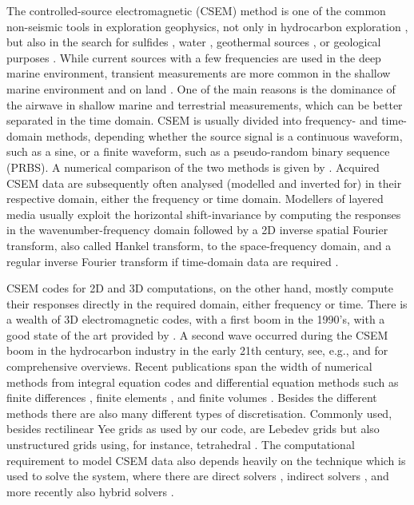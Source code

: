 \documentclass[
    manuscript,
  ]{geophysics}
\begin{document}
The controlled-source electromagnetic (CSEM) method is one of the common
non-seismic tools in exploration geophysics, not only in hydrocarbon
exploration \citep{GEO.10.Constable}, but also in the search for sulfides
\citep{GRL.19.Gehrmann}, water \citep{GEO.05.Pedersen}, geothermal sources
\citep{WGC.15.Girard}, or geological purposes \citep{NAT.19.Johanson}. While
current sources with a few frequencies are used in the deep marine environment,
transient measurements are more common in the shallow marine environment and on
land \citep[e.g., ][]{GEO.07.Ziolkowski, SEG.07.Andreis, SEG.07.Avdeeva}. One
of the main reasons is the dominance of the airwave in shallow marine and
terrestrial measurements, which can be better separated in the time domain.
CSEM is usually divided into frequency- and time-domain methods, depending
whether the source signal is a continuous waveform, such as a sine, or a finite
waveform, such as a pseudo-random binary sequence (PRBS). A numerical
comparison of the two methods is given by \cite{GP.13.Conell}. Acquired CSEM
data are subsequently often analysed (modelled and inverted for) in their
respective domain, either the frequency or time domain. Modellers of layered
media usually exploit the horizontal shift-invariance by computing the
responses in the wavenumber-frequency domain followed by a 2D inverse spatial
Fourier transform, also called Hankel transform, to the space-frequency domain,
and a regular inverse Fourier transform if time-domain data are required
\citep[e.g., ][]{GEO.15.Hunziker}.

CSEM codes for 2D and 3D computations, on the other hand, mostly compute their
responses directly in the required domain, either frequency or time. There is a
wealth of 3D electromagnetic codes, with a first boom in the 1990's, with a
good state of the art provided by \cite{B.SEG.99.Oristaglio}. A second wave
occurred during the CSEM boom in the hydrocarbon industry in the early 21th
century, see, e.g., \cite{SG.05.Avdeev} and \cite{SG.10.Borner} for
comprehensive overviews. Recent publications span the width of numerical
methods from integral equation codes \citep{MGS.17.Kruglyakov} and differential
equation methods such as finite differences \citep{CAG.13.Sommer}, finite
elements \citep{GJI.13.Grayver}, and finite volumes \citep{GEO.14.Jahandari}.
Besides the different methods there are also many different types of
discretisation. Commonly used, besides rectilinear Yee grids
\citep{IEEE.66.Yee} as used by our code, are Lebedev grids
\citep{CMMP.64.Lebedev} but also unstructured grids using, for instance,
tetrahedral \citep{CAG.17.Cai}. The computational requirement to model CSEM
data also depends heavily on the technique which is used to solve the system,
where there are direct solvers \citep{GEO.15.Grayver}, indirect solvers
\citep{GJI.15.Jaysaval}, and more recently also hybrid solvers
\citep{GEO.18.Liu}.
\end{document}
